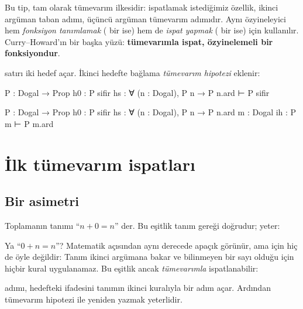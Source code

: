 
\noindent Bu tip, tam olarak tümevarım ilkesidir:  ispatlamak
istediğimiz özellik, ikinci argüman taban adımı, üçüncü argüman
tümevarım adımıdır. Aynı özyineleyici hem \emph{fonksiyon tanımlamak}
( bir  ise) hem de \emph{ispat yapmak} (
bir  ise) için kullanılır. Curry--Howard'ın bir başka
yüzü: \textbf{tümevarımla ispat, özyinelemeli bir fonksiyondur}.


\noindent {} satırı iki hedef açar. İkinci
hedefte bağlama \emph{tümevarım hipotezi}  eklenir:

\begin{hedefgecisi}
\begin{hedefdurumu}
P : Dogal → Prop
h0 : P sifir
hs : ∀ (n : Dogal), P n → P n.ard
⊢ P sifir
\end{hedefdurumu}
\sonra
\begin{hedefdurumu}
P : Dogal → Prop
h0 : P sifir
hs : ∀ (n : Dogal), P n → P n.ard
m : Dogal
ih : P m
⊢ P m.ard
\end{hedefdurumu}
\end{hedefgecisi}

\section{İlk tümevarım ispatları}\label{sec:ilk-tumevarim}

\subsection{Bir asimetri}

Toplamanın tanımı ``$n + 0 = n$'' der. Bu eşitlik tanım gereği doğrudur;
 yeter:


\noindent Ya ``$0 + n = n$''? Matematik açısından aynı derecede apaçık
görünür, ama \Lean{} için hiç de öyle değildir: Tanım ikinci argümana
bakar ve  bilinmeyen bir sayı olduğu için hiçbir kural
uygulanamaz. Bu eşitlik ancak \emph{tümevarımla} ispatlanabilir:


\noindent {} adımı, hedefteki 
ifadesini tanımın ikinci kuralıyla bir adım açar. Ardından tümevarım
hipotezi  ile yeniden yazmak yeterlidir.

